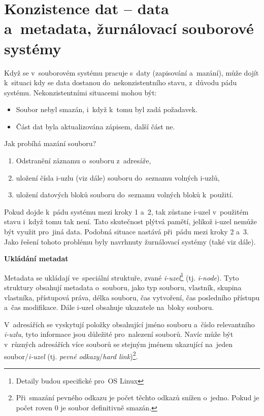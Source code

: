 
\clearpage
\section{Konzistence dat -- data a~metadata, žurnálovací souborové systémy}

Když se v~souborovém systému pracuje s~daty (zapisování a~mazání), může dojít k~situaci kdy se data dostanou do~nekonzistentního stavu, z~důvodu pádu systému. Nekonzistentními situacemi mohou být:

\begin{itemize}
	\item Soubor nebyl smazán, i~když k~tomu byl zadá požadavek.
	\item Část dat byla aktualizována zápisem, další část ne. 
\end{itemize}

Jak probíhá mazání souboru?

\begin{enumerate}
	\item Odstranění záznamu o~souboru z~adresáře,
	\item uložení čísla i-uzlu (viz dále) souboru do~seznamu volných i-uzlů,
	\item uložení datových bloků souboru do~seznamu volných bloků k~použití.
\end{enumerate}

Pokud dojde k~pádu systému mezi kroky 1 a~2, tak zůstane i-uzel v~použitém stavu i~když tomu tak není. Tato skutečnost plýtvá pamětí, jelikož i-uzel nemůže být využit pro~jiná data. Podobná situace nastává při~pádu mezi kroky 2 a~3. Jako řešení tohoto problému byly navrhnuty žurnálovací systémy (také viz dále). 

\begin{Large}
	\vspace{0,5cm}
	\textbf{Ukládání metadat}
\end{Large}

Metadata se ukládají ve~speciální struktuře, zvané \emph{i-uzel}\footnote{Detaily budou specifické pro~OS Linux} (tj. \emph{i-node}). Tyto struktury obsahují metadata o~souboru, jako typ souboru, vlastník, skupina vlastníka, přístupová práva, délka souboru, čas vytvoření, čas posledního přístupu a~čas modifikace. Dále i-uzel obsahuje ukazatele na~bloky souboru. 

\vspace{0,5cm}

V~adresářích se vyskytují položky obsahující jméno souboru a~číslo relevantního \emph{i-uzlu}, tyto informace jsou důležité pro~nalezení souborů. Navíc může být v~různých adresářích více souborů se stejným jménem ukazující na~jeden soubor/\emph{i-uzel} (tj. \emph{pevné odkazy}/\emph{hard link})\footnote{Při~smazání pevného odkazu je počet těchto odkazů snížen o~jedno. Pokud je počet roven 0 je soubor definitivně smazán.}.

